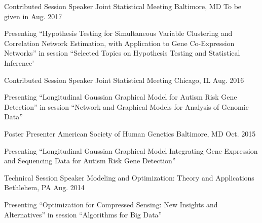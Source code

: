

\begin{cventries}

  \cventry
    {Contributed Session Speaker} %
    {Joint Statistical Meeting} %
    {Baltimore, MD} %
    {To be given in Aug. 2017} %
    {
      \begin{cvitems} %
        \item {Presenting ``Hypothesis Testing for Simultaneous Variable Clustering and Correlation Network Estimation, with Application to Gene Co-Expression Networks'' in session ``Selected Topics on Hypothesis Testing and Statistical Inference'}
      \end{cvitems}
    }


  \cventry
    {Contributed Session Speaker} %
    {Joint Statistical Meeting} %
    {Chicago, IL} %
    {Aug. 2016} %
    {
      \begin{cvitems} %
        \item {Presenting ``Longitudinal Gaussian Graphical Model for Autism Risk Gene Detection'' in session ``Network and Graphical Models for Analysis of Genomic Data''}
      \end{cvitems}
    }

  \cventry
    {Poster Presenter} %
    {American Society of Human Genetics} %
    {Baltimore, MD} %
    {Oct. 2015} %
    {
      \begin{cvitems} %
        \item {Presenting ``Longitudinal Gaussian Graphical Model Integrating Gene Expression and Sequencing Data for Autism
        Risk Gene Detection''}
      \end{cvitems}
    }
    
  \cventry
    {Technical Session Speaker} %
    {Modeling and Optimization: Theory and Applications} %
    {Bethlehem, PA} %
    {Aug. 2014} %
    {
      \begin{cvitems} %
        \item {Presenting ``Optimization for Compressed Sensing: New Insights and Alternatives'' in session ``Algorithms for Big Data''}
      \end{cvitems}
    }


\end{cventries}
